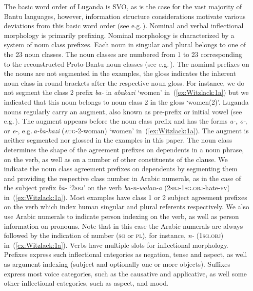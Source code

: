 \documentclass[output=paper,colorlinks,citecolor=brown,
]{langscibook}
\begin{document}
The basic word order of Luganda is SVO, as is the case for the vast majority of Bantu languages, however, information structure considerations motivate various deviations from this basic word order (see e.g.\,\citealt{DowningMarten2019}). 
Nominal and verbal inflectional morphology is primarily prefixing. 
Nominal morphology is characterized by a system of noun class prefixes. 
Each noun in singular and plural belongs to one of the 23 noun classes. The noun classes are numbered from 1 to 23 corresponding to the reconstructed Proto-Bantu noun classes (see e.g.\,\citealt[237–239]{VanDerVeldeEtAl2019}). The nominal prefixes on the nouns are not segmented in the examples, the gloss indicates the inherent noun class in round brackets after the respective noun gloss. For instance, we do not segment the class 2 prefix \emph{ba-} in \emph{abakazi} ‘women’ in~(\ref{ex:Witzlack:1a}) but we indicated that this noun belongs to noun class 2 in the gloss ‘women(2)’. 
Luganda nouns regularly carry an augment, also known as pre-prefix or initial vowel (see e.g.\,\citealt[247–255]{VanDerVeldeEtAl2019}). 
The augment appears before the noun class prefix and has the forms \mbox{\emph{a-},} \emph{o-}, or \emph{e-}, e.g.\,\emph{a-ba-kazi} (\textsc{aug}-2-woman) ‘women’ in~(\ref{ex:Witzlack:1a}). The augment is neither segmented nor glossed in the examples in this paper. The noun class determines the shape of the agreement prefixes on dependents in a noun phrase, on the verb, as well as on a number of other constituents of the clause. We indicate the noun class agreement prefixes on dependents by segmenting them and providing the respective class number in Arabic numerals, as in the case of the subject prefix \emph{ba-} ‘2\textsc{sbj}’ on the verb \emph{ba-n-walan-a} (\textsc{2sbj}-\textsc{1sg.obj}-hate-\textsc{fv}) in~(\ref{ex:Witzlack:1a}). 
Most examples have class 1 or 2 subject agreement prefixes on the verb which index human singular and plural referents respectively. We also use Arabic numerals to indicate person indexing on the verb, as well as person information on pronouns. 
Note that in this case the Arabic numerals are always followed by the indication of number (\textsc{sg} or \textsc{pl}), for instance, \emph{n-} (\textsc{1sg.obj}) in~(\ref{ex:Witzlack:1a}). 
Verbs have multiple slots for inflectional morphology. Prefixes express such inflectional categories as negation, tense and aspect, as well as argument indexing (subject and optionally one or more objects). 
Suffixes express most voice categories, such as the causative and applicative, as well some other inflectional categories, such as aspect, and mood.
\end{document}
